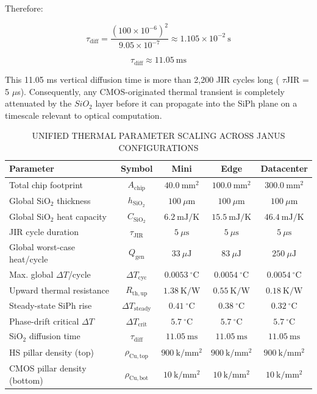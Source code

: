 \documentclass[journal]{IEEEtran}
\begin{document}
Therefore:

\begin{equation}
\tau_{\mathrm{diff}}
=
\frac{(100 \times 10^{-6})^{2}}
     {9.05 \times 10^{-7}}
\approx
1.105 \times 10^{-2}~\mathrm{s}
\end{equation}

\begin{equation}
\tau_{\mathrm{diff}} \approx 11.05~\mathrm{ms}
\end{equation}

This 11.05 ms vertical diffusion time is more than 2,200 JIR cycles long ( $\tau$JIR = 5 $\mu$s). Consequently, any CMOS-originated thermal transient is completely attenuated by the $SiO_2$ layer before it can propagate into the SiPh plane on a timescale relevant to optical computation.

\begin{table}[htbp]
\centering
\small
\setlength{\tabcolsep}{5pt}
\caption{UNIFIED THERMAL PARAMETER SCALING ACROSS JANUS CONFIGURATIONS}
\label{tab:table11}
\begin{tabular}{lcccc}
\toprule
Parameter & Symbol & Mini & Edge & Datacenter \\
\midrule
Total chip footprint & $A_{\mathrm{chip}}$ & $40.0~\mathrm{mm^2}$ & $100.0~\mathrm{mm^2}$ & $300.0~\mathrm{mm^2}$ \\
Global SiO$_2$ thickness & $h_{\mathrm{SiO_2}}$ & $100~\mu\mathrm{m}$ & $100~\mu\mathrm{m}$ & $100~\mu\mathrm{m}$ \\
Global SiO$_2$ heat capacity & $C_{\mathrm{SiO_2}}$ & $6.2~\mathrm{mJ/K}$ & $15.5~\mathrm{mJ/K}$ & $46.4~\mathrm{mJ/K}$ \\
JIR cycle duration & $\tau_{\mathrm{JIR}}$ & $5~\mu\mathrm{s}$ & $5~\mu\mathrm{s}$ & $5~\mu\mathrm{s}$ \\
Global worst-case heat/cycle & $Q_{\mathrm{gen}}$ & $33~\mu\mathrm{J}$ & $83~\mu\mathrm{J}$ & $250~\mu\mathrm{J}$ \\
Max. global $\Delta T$/cycle & $\Delta T_{\mathrm{cyc}}$ & $0.0053~^\circ\mathrm{C}$ & $0.0054~^\circ\mathrm{C}$ & $0.0054~^\circ\mathrm{C}$ \\
Upward thermal resistance & $R_{\mathrm{th,up}}$ & $1.38~\mathrm{K/W}$ & $0.55~\mathrm{K/W}$ & $0.18~\mathrm{K/W}$ \\
Steady-state SiPh rise & $\Delta T_{\mathrm{steady}}$ & $0.41~^\circ\mathrm{C}$ & $0.38~^\circ\mathrm{C}$ & $0.32~^\circ\mathrm{C}$ \\
Phase-drift critical $\Delta T$ & $\Delta T_{\mathrm{crit}}$ & $5.7~^\circ\mathrm{C}$ & $5.7~^\circ\mathrm{C}$ & $5.7~^\circ\mathrm{C}$ \\
SiO$_2$ diffusion time & $\tau_{\mathrm{diff}}$ & $11.05~\mathrm{ms}$ & $11.05~\mathrm{ms}$ & $11.05~\mathrm{ms}$ \\
HS pillar density (top) & $\rho_{\mathrm{Cu,top}}$ & $900~\mathrm{k/mm^2}$ & $900~\mathrm{k/mm^2}$ & $900~\mathrm{k/mm^2}$ \\
CMOS pillar density (bottom) & $\rho_{\mathrm{Cu,bot}}$ & $10~\mathrm{k/mm^2}$ & $10~\mathrm{k/mm^2}$ & $10~\mathrm{k/mm^2}$ \\
\bottomrule
\end{tabular}
\end{table}
\end{document}
